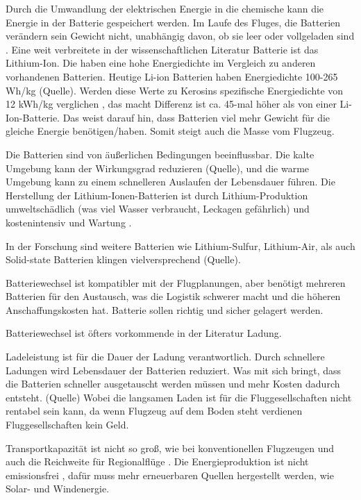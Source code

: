 Durch die Umwandlung der elektrischen Energie in die chemische kann die Energie in der Batterie gespeichert werden.
Im Laufe des Fluges, die Batterien verändern sein Gewicht nicht, unabhängig davon, ob sie leer oder vollgeladen sind \cite{donckers2024electric}. 
Eine weit verbreitete in der wissenschaftlichen Literatur Batterie ist das Lithium-Ion. Die haben eine hohe Energiedichte im Vergleich zu anderen vorhandenen Batterien. %
Heutige Li-ion Batterien haben Energiedichte 100-265 Wh/kg (Quelle). Werden diese Werte zu Kerosins spezifische Energiedichte von 12 kWh/kg verglichen \cite{dalmia2022powering},
das macht Differenz ist ca. 45-mal höher als von einer Li-Ion-Batterie. Das weist darauf hin, dass Batterien viel mehr Gewicht für die gleiche Energie benötigen/haben. Somit steigt auch
die Masse vom Flugzeug.

Die Batterien sind von äußerlichen Bedingungen beeinflussbar. Die kalte Umgebung kann 
der Wirkungsgrad reduzieren (Quelle), und die warme Umgebung kann zu einem schnelleren Auslaufen der Lebensdauer führen.
Die Herstellung der Lithium-Ionen-Batterien ist durch Lithium-Produktion umweltschädlich (was viel Wasser verbraucht, Leckagen gefährlich) und 
kostenintensiv und Wartung \cite{dalmia2022powering}. 

In der Forschung sind weitere Batterien wie Lithium-Sulfur, Lithium-Air, als auch Solid-state Batterien klingen vielversprechend (Quelle).
%
%

Batteriewechsel ist kompatibler mit der Flugplanungen, aber benötigt mehreren Batterien für den Austausch, was die Logistik schwerer macht 
und die höheren Anschaffungskosten hat. Batterie sollen richtig und sicher gelagert werden. \cite{salucci2020optimal}

Batteriewechsel ist öfters vorkommende in der Literatur Ladung.

Ladeleistung ist für die Dauer der Ladung verantwortlich. Durch schnellere Ladungen wird Lebensdauer der Batterien reduziert. Was mit sich bringt, dass die Batterien schneller ausgetauscht werden müssen
und mehr Kosten dadurch entsteht. (Quelle) Wobei die langsamen Laden ist für die Fluggesellschaften nicht rentabel sein kann, 
da wenn Flugzeug auf dem Boden steht verdienen Fluggesellschaften kein Geld.

Transportkapazität ist nicht so groß, wie bei konventionellen Flugzeugen und auch die Reichweite für Regionalflüge \cite{abrantes2024impact}.
Die Energieproduktion ist nicht emissionsfrei \cite{abrantes2024impact}, dafür muss mehr erneuerbaren Quellen hergestellt werden, 
wie Solar- und Windenergie. 

